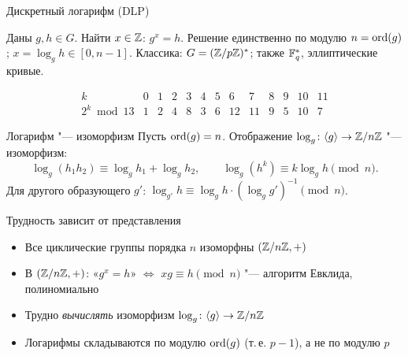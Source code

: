 \documentclass{ca-slides}
\begin{document}
\begin{canvasframe}{Дискретный логарифм (DLP)}
  \begin{definition}
    Даны $g, h \in G$. Найти $x \in \mathbb{Z}$: $g^x = h$.
    Решение единственно по модулю $n = \operatorname{ord}(g)$; $x = \log_g h \in [0, n - 1]$.
    Классика: $G = (\mathbb{Z}/p\mathbb{Z})^{*}$; также $\mathbb{F}_{q}^*$, эллиптические кривые.
  \end{definition}
  \small\[
  \begin{array}{c|cccccccccccc}
    k & 0 & 1 & 2 & 3 & 4 & 5 & 6 & 7 & 8 & 9 & 10 & 11 \\ \hline
    2^k \bmod 13 & 1 & 2 & 4 & 8 & 3 & 6 & 12 & 11 & 9 & 5 & 10 & 7
  \end{array}
  \]
\end{canvasframe}

\begin{theoremframe}[proposition]{Логарифм "--- изоморфизм}
  Пусть $\operatorname{ord}(g) = n$. Отображение $\log_g \colon \langle g \rangle \to \mathbb{Z}/n\mathbb{Z}$ "--- изоморфизм:
  \[
    \log_g(h_1 h_2) \equiv \log_g h_1 + \log_g h_2, \qquad \log_g(h^k) \equiv k \log_g h \pmod n .
  \]
  Для другого образующего $g'$: $\log_{g'} h \equiv \log_g h \cdot (\log_g g')^{-1} \pmod n$.
\end{theoremframe}

\begin{canvasframe}{Трудность зависит от представления}
  \begin{itemize}
    \item Все циклические группы порядка $n$ изоморфны $(\mathbb{Z}/n\mathbb{Z}, +)$
    \item В $(\mathbb{Z}/n\mathbb{Z}, +)$: «$g^x = h$» $\iff$ $xg \equiv h \pmod n$ "--- алгоритм Евклида,
      полиномиально
    \item Трудно \emph{вычислять} изоморфизм $\log_g \colon \langle g \rangle \to \mathbb{Z}/n\mathbb{Z}$
    \item Логарифмы складываются по модулю $\operatorname{ord}(g)$ (т.\,е. $p - 1$), а не по модулю $p$
  \end{itemize}
  \penspace[0.25\textheight]
\end{canvasframe}
\end{document}
